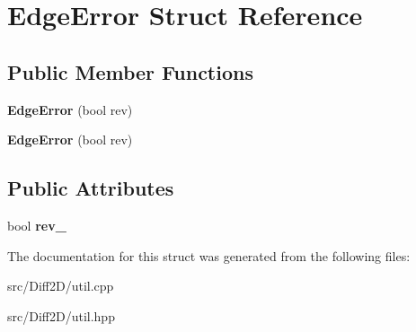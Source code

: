 \hypertarget{structEdgeError}{
\section{EdgeError Struct Reference}
\label{structEdgeError}
}
\subsection*{Public Member Functions}
\begin{DoxyCompactItemize}
\item 
\hypertarget{structEdgeError_a92ca9588f65b2b4d17139ff80eb29ab3}{
{\bfseries EdgeError} (bool rev)}
\label{structEdgeError_a92ca9588f65b2b4d17139ff80eb29ab3}

\item 
\hypertarget{structEdgeError_a92ca9588f65b2b4d17139ff80eb29ab3}{
{\bfseries EdgeError} (bool rev)}
\label{structEdgeError_a92ca9588f65b2b4d17139ff80eb29ab3}

\end{DoxyCompactItemize}
\subsection*{Public Attributes}
\begin{DoxyCompactItemize}
\item 
\hypertarget{structEdgeError_a704a81b20878f5b534df310ea179ae02}{
bool {\bfseries rev\_\-}}
\label{structEdgeError_a704a81b20878f5b534df310ea179ae02}

\end{DoxyCompactItemize}


The documentation for this struct was generated from the following files:\begin{DoxyCompactItemize}
\item 
src/Diff2D/util.cpp\item 
src/Diff2D/util.hpp\end{DoxyCompactItemize}
